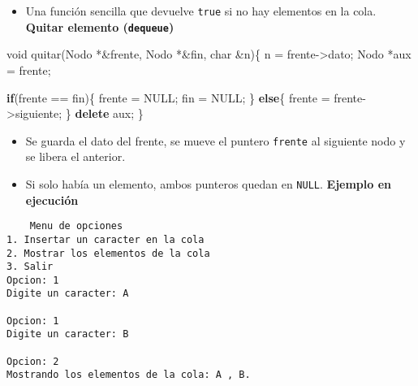 \documentclass[
  11pt,
  a4paper,
  DIV=11,
  numbers=noendperiod]{scrreprt}
\newenvironment{Shaded}{\begin{snugshade}}{\end{snugshade}}
\newcommand{\ControlFlowTok}[1]{\textcolor[rgb]{0.00,0.23,0.31}{\textbf{#1}}}
\newcommand{\DataTypeTok}[1]{\textcolor[rgb]{0.68,0.00,0.00}{#1}}
\newcommand{\KeywordTok}[1]{\textcolor[rgb]{0.00,0.23,0.31}{\textbf{#1}}}
\newcommand{\NormalTok}[1]{\textcolor[rgb]{0.00,0.23,0.31}{#1}}
\newcommand{\OperatorTok}[1]{\textcolor[rgb]{0.37,0.37,0.37}{#1}}
\providecommand{\tightlist}{%
  \setlength{\itemsep}{0pt}\setlength{\parskip}{0pt}}
\begin{document}
\begin{itemize}
\tightlist
\item
  Una función sencilla que devuelve \texttt{true} si no hay elementos en
  la cola. \textbf{Quitar elemento (\texttt{dequeue})}
\end{itemize}

\begin{Shaded}
\begin{Highlighting}[]
\DataTypeTok{void}\NormalTok{ quitar}\OperatorTok{(}\NormalTok{Nodo }\OperatorTok{*\&}\NormalTok{frente}\OperatorTok{,}\NormalTok{ Nodo }\OperatorTok{*\&}\NormalTok{fin}\OperatorTok{,} \DataTypeTok{char} \OperatorTok{\&}\NormalTok{n}\OperatorTok{)\{}
\NormalTok{    n }\OperatorTok{=}\NormalTok{ frente}\OperatorTok{{-}\textgreater{}}\NormalTok{dato}\OperatorTok{;}
\NormalTok{    Nodo }\OperatorTok{*}\NormalTok{aux }\OperatorTok{=}\NormalTok{ frente}\OperatorTok{;}

    \ControlFlowTok{if}\OperatorTok{(}\NormalTok{frente }\OperatorTok{==}\NormalTok{ fin}\OperatorTok{)\{}
\NormalTok{        frente }\OperatorTok{=}\NormalTok{ NULL}\OperatorTok{;}
\NormalTok{        fin }\OperatorTok{=}\NormalTok{ NULL}\OperatorTok{;}
    \OperatorTok{\}}
    \ControlFlowTok{else}\OperatorTok{\{}
\NormalTok{        frente }\OperatorTok{=}\NormalTok{ frente}\OperatorTok{{-}\textgreater{}}\NormalTok{siguiente}\OperatorTok{;}
    \OperatorTok{\}}
    \KeywordTok{delete}\NormalTok{ aux}\OperatorTok{;}
\OperatorTok{\}}
\end{Highlighting}
\end{Shaded}

\begin{itemize}
\tightlist
\item
  Se guarda el dato del frente, se mueve el puntero \texttt{frente} al
  siguiente nodo y se libera el anterior.
\item
  Si solo había un elemento, ambos punteros quedan en \texttt{NULL}.
  \textbf{Ejemplo en ejecución}
\end{itemize}

\begin{tcolorbox}[custombox]
\begin{verbatim}
    Menu de opciones
1. Insertar un caracter en la cola
2. Mostrar los elementos de la cola
3. Salir
Opcion: 1
Digite un caracter: A

Opcion: 1
Digite un caracter: B

Opcion: 2
Mostrando los elementos de la cola: A , B.
\end{verbatim}
\end{tcolorbox}
\end{document}
